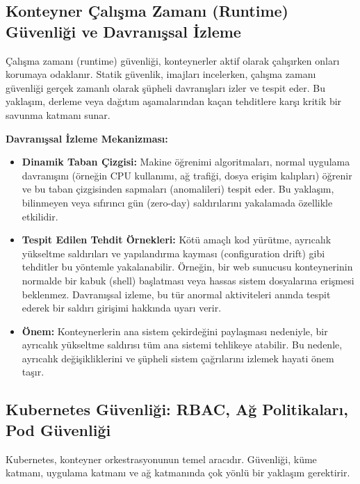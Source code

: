 \subsection{Konteyner Çalışma Zamanı (Runtime) Güvenliği ve Davranışsal İzleme}

Çalışma zamanı (runtime) güvenliği, konteynerler aktif olarak çalışırken onları korumaya odaklanır. Statik güvenlik, imajları incelerken, çalışma zamanı güvenliği gerçek zamanlı olarak şüpheli davranışları izler ve tespit eder. Bu yaklaşım, derleme veya dağıtım aşamalarından kaçan tehditlere karşı kritik bir savunma katmanı sunar.

\textbf{Davranışsal İzleme Mekanizması:}
\begin{itemize}
    \item \textbf{Dinamik Taban Çizgisi:} Makine öğrenimi algoritmaları, normal uygulama davranışını (örneğin CPU kullanımı, ağ trafiği, dosya erişim kalıpları) öğrenir ve bu taban çizgisinden sapmaları (anomalileri) tespit eder. Bu yaklaşım, bilinmeyen veya sıfırıncı gün (zero-day) saldırılarını yakalamada özellikle etkilidir.
    \item \textbf{Tespit Edilen Tehdit Örnekleri:} Kötü amaçlı kod yürütme, ayrıcalık yükseltme saldırıları ve yapılandırma kayması (configuration drift) gibi tehditler bu yöntemle yakalanabilir. Örneğin, bir web sunucusu konteynerinin normalde bir kabuk (shell) başlatması veya hassas sistem dosyalarına erişmesi beklenmez. Davranışsal izleme, bu tür anormal aktiviteleri anında tespit ederek bir saldırı girişimi hakkında uyarı verir.
    \item \textbf{Önem:} Konteynerlerin ana sistem çekirdeğini paylaşması nedeniyle, bir ayrıcalık yükseltme saldırısı tüm ana sistemi tehlikeye atabilir. Bu nedenle, ayrıcalık değişikliklerini ve şüpheli sistem çağrılarını izlemek hayati önem taşır.
\end{itemize}

\subsection{Kubernetes Güvenliği: RBAC, Ağ Politikaları, Pod Güvenliği}

Kubernetes, konteyner orkestrasyonunun temel aracıdır. Güvenliği, küme katmanı, uygulama katmanı ve ağ katmanında çok yönlü bir yaklaşım gerektirir.

